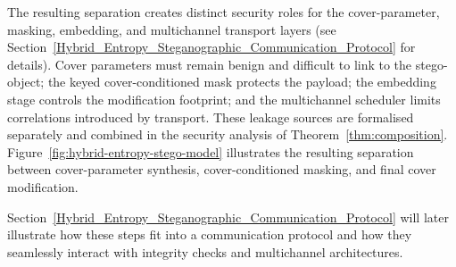 \documentclass[pdflatex,sn-mathphys-num]{sn-jnl}%
\theoremstyle{definition}
\theoremstyle{game}
\theoremstyle{thmstyleone}%
\theoremstyle{thmstyletwo}%
\theoremstyle{thmstylethree}%
\begin{document}
The resulting separation creates distinct security roles for the cover-parameter, masking, embedding, and multichannel transport layers (see Section~\ref{Hybrid_Entropy_Steganographic_Communication_Protocol} for details). Cover parameters must remain benign and difficult to link to the stego-object; the keyed cover-conditioned mask protects the payload; the embedding stage controls the modification footprint; and the multichannel scheduler limits correlations introduced by
transport. These leakage sources are formalised separately and combined in the security analysis of
Theorem~\ref{thm:composition}. Figure~\ref{fig:hybrid-entropy-stego-model} illustrates the resulting separation between cover-parameter synthesis, cover-conditioned masking, and final cover modification.

Section~\ref{Hybrid_Entropy_Steganographic_Communication_Protocol} will later illustrate how these steps fit into a communication protocol and how they seamlessly interact with integrity checks and multichannel architectures.
\end{document}

